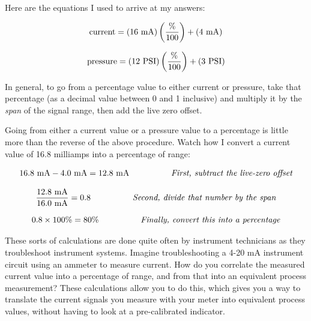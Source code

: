 





Here are the equations I used to arrive at my answers:

$$\hbox{current} = (16 \hbox{ mA}) \left( {\% \over 100}\right) + (4 \hbox{ mA})$$

$$\hbox{pressure} = (12 \hbox{ PSI}) \left( {\% \over 100}\right) + (3 \hbox{ PSI})$$

In general, to go from a percentage value to either current or pressure, take that percentage (as a decimal value between 0 and 1 inclusive) and multiply it by the {\it span} of the signal range, then add the live zero offset.

\vskip 10pt

Going from either a current value or a pressure value to a percentage is little more than the reverse of the above procedure.  Watch how I convert a current value of 16.8 milliamps into a percentage of range:

$$16.8 \hbox{ mA} - 4.0 \hbox{ mA} = 12.8 \hbox{ mA} \hskip 50pt \hbox{\it First, subtract the live-zero offset}$$

$${12.8 \hbox{ mA} \over 16.0 \hbox{ mA}} = 0.8 \hskip 50pt \hbox{\it Second, divide that number by the span}$$

$$0.8 \times 100\% = 80\% \hskip 50pt \hbox{\it Finally, convert this into a percentage}$$

These sorts of calculations are done quite often by instrument technicians as they troubleshoot instrument systems.  Imagine troubleshooting a 4-20 mA instrument circuit using an ammeter to measure current.  How do you correlate the measured current value into a percentage of range, and from that into an equivalent process measurement?  These calculations allow you to do this, which gives you a way to translate the current signals you measure with your meter into equivalent process values, without having to look at a pre-calibrated indicator.





